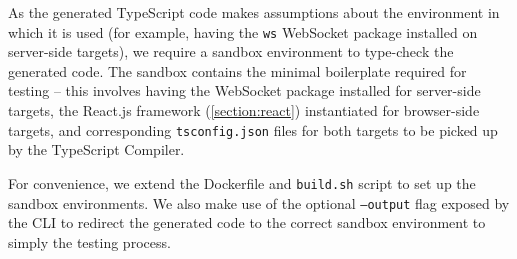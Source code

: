 As the generated TypeScript code makes assumptions about the
environment in which it is used (for example, having the \texttt{ws}
WebSocket package installed on server-side targets), we require a
sandbox environment to type-check the generated code. 
The sandbox contains the minimal boilerplate required
for testing -- this involves having the WebSocket package installed
for server-side targets, the React.js framework (\cref{section:react})
instantiated for browser-side targets,
and corresponding \texttt{tsconfig.json} files for both targets to
be picked up by the TypeScript Compiler.

For convenience, we extend the
Dockerfile and \texttt{build.sh} script 
to set up the sandbox environments. 
We also make use of the optional
\texttt{--output} flag exposed by the  CLI
to redirect the generated code to the correct sandbox environment
to simply the testing process.